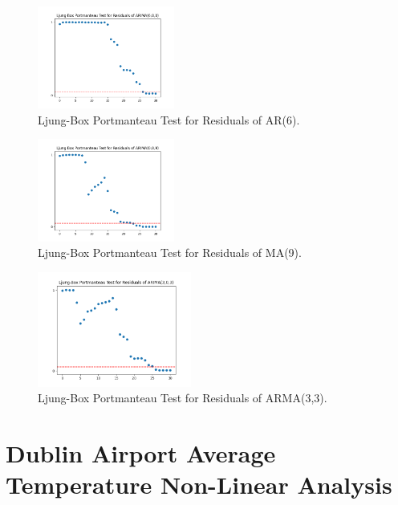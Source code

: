 \documentclass[conference]{IEEEtran}
\begin{document}
\begin{figure}[ht]
    \centering
    \includegraphics[width=0.40\textwidth]{Figures/Ljung-Box Portmanteau Test for Residuals of ARIMA(6,0,0).png}
    \caption{Ljung-Box Portmanteau Test for Residuals of AR(6).}
    \label{p6}
\end{figure}

\begin{figure}[ht]
    \centering
    \includegraphics[width=0.40\textwidth]{Figures/Ljung-Box Portmanteau Test for Residuals of ARIMA(0,0,9).png}
    \caption{Ljung-Box Portmanteau Test for Residuals of MA(9).}
    \label{p9}
\end{figure}

\begin{figure}[ht]
    \centering
    \includegraphics[width=0.45\textwidth]{Figures/Ljung-Box Portmanteau Test for Residuals of ARIMA(3,0,3).png}
    \caption{Ljung-Box Portmanteau Test for Residuals of ARMA(3,3).}
    \label{p33}
\end{figure}

\section{Dublin Airport Average Temperature \break Non-Linear Analysis}
\end{document}
